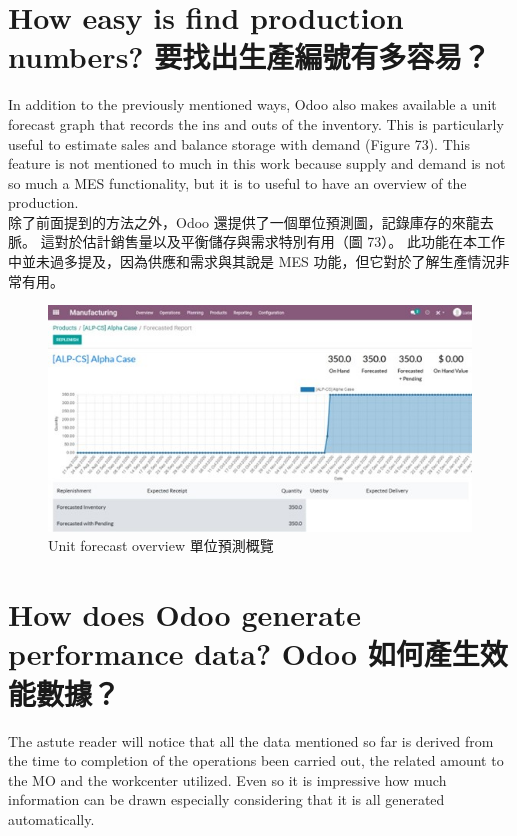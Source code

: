 \section{How easy is find production numbers? 要找出生產編號有多容易？}
\fontsize{12pt}{2.5pt}\selectfont 
{In addition to the previously mentioned ways, Odoo also makes available a unit forecast graph that records the ins and outs of the inventory. This is particularly useful to estimate sales and balance storage with demand (Figure 73). This feature is not mentioned to much in this work because supply and demand is not so much a MES functionality, but it is to useful to have an overview of the production.}\\[1pt]

\fontsize{12pt}{2.5pt}\selectfont
{除了前面提到的方法之外，Odoo 還提供了一個單位預測圖，記錄庫存的來龍去脈。 這對於估計銷售量以及平衡儲存與需求特別有用（圖 73）。 此功能在本工作中並未過多提及，因為供應和需求與其說是 MES 功能，但它對於了解生產情況非常有用。}\\[1pt]

\begin{figure}[hbt!]
\begin{center}
\includegraphics[width=15cm]{73}
\caption{\Large  Unit forecast overview 單位預測概覽}\label{fig.73}
\end{center}
\end{figure}

\section{How does Odoo generate performance data? Odoo 如何產生效能數據？}
\fontsize{12pt}{2.5pt}\selectfont 
{The astute reader will notice that all the data mentioned so far is derived from the time to completion of the operations been carried out, the related amount to the MO and the workcenter utilized. Even so it is impressive how much information can be drawn especially considering that it is all generated automatically.}\\[1pt]

